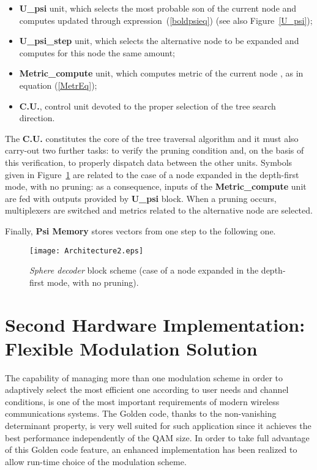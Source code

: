 \documentclass[12pt,onecolumn,draftclsnofoot]{IEEEtran}
\begin{document}
\begin{itemize}
\item \textbf{U\_psi} unit, which selects the most probable son of the current 
node and computes updated  through expression~(\ref{boldpsieq}) 
(see also Figure~\ref{U_psi});
\item \textbf{U\_psi\_step} unit, which selects the alternative node to be 
expanded and computes for this node the same amount;

\item \textbf{Metric\_compute} unit, which computes metric of the current node 
, 
as in equation (\ref{MetrEq});

\item \textbf{C.U.}, control unit devoted to the proper selection of the
tree search direction.
\end{itemize}

The {\bf C.U.} constitutes the core of the tree traversal algorithm
and it must also carry-out two further tasks: to verify the pruning
condition and, on the basis of this verification, to properly
dispatch data between the other units. Symbols given in Figure~\ref{Architecture}
are related to the case of a node expanded in the depth-first mode, with
no pruning: as a consequence, inputs of the \textbf{Metric\_compute} unit 
are fed with outputs provided by \textbf{U\_psi} block. When a pruning
occurs, multiplexers are switched and metrics related to the alternative node
are selected.

Finally, \textbf{Psi Memory} stores  vectors 
from one step to the following one.

\begin{figure}[ht]
    \begin{center}
    \texttt{[image: Architecture2.eps]}
    \caption{{\it Sphere decoder} block scheme (case of a node expanded in the depth-first mode, with
no pruning). }
    \label{Architecture}
    \end{center}
\end{figure}
\section{Second Hardware Implementation: Flexible Modulation Solution}

\label{HW2}

The capability of managing more than one modulation
scheme in order to adaptively select the most efficient one according to user
needs and channel conditions, is one of the most important requirements of
modern wireless communications systems.
The Golden code, thanks to the non-vanishing determinant property, is
very well suited for such application since it achieves the best performance
independently of the QAM size.
In order to take full advantage of this Golden code feature, an enhanced 
implementation has been realized to allow run-time choice of the modulation 
scheme.
\end{document}
